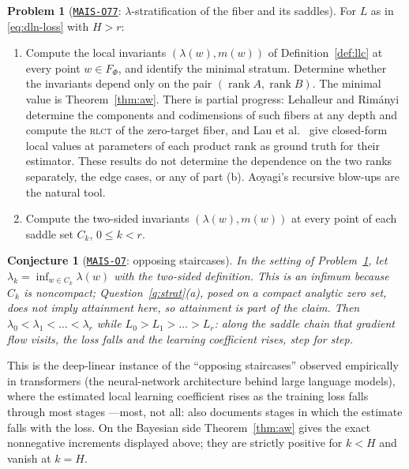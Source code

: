 \documentclass[11pt]{amsart}
\newcommand{\Oid}[1]{\href{https://github.com/lionellevine/MAIS/blob/main/open-problems/MAIS-O#1.md}{\texttt{MAIS-O#1}}}
\theoremstyle{plain}
\newtheorem{conjecture}[theorem]{Conjecture}
\theoremstyle{definition}
\newtheorem{problem}[theorem]{Problem}
\newcommand{\rank}{\operatorname{rank}}
\begin{document}
\begin{problem}[\Oid{77}: $\lambda$-stratification of the fiber and its saddles]\label{prob:fiber}
For $L$ as in \eqref{eq:dln-loss} with $H > r$:
\begin{enumerate}
\item[(a)] Compute the local invariants $(\lambda(w), m(w))$ of Definition~\ref{def:llc} at every point $w \in F_\Phi$, and identify the minimal stratum. Determine whether the invariants depend only on the pair $(\rank A, \rank B)$. The minimal value is Theorem~\ref{thm:aw}. There is partial progress: Lehalleur and Rim\'anyi \cite{lehalleurrimanyi2024} determine the components and codimensions of such fibers at any depth and compute the \textsc{rlct} of the zero-target fiber, and Lau et al.~\cite{lau2023} give closed-form local values at parameters of each product rank as ground truth for their estimator. These results do not determine the dependence on the two ranks separately, the edge cases, or any of part (b). Aoyagi's recursive blow-ups \cite{aoyagi2005,aoyagi2024} are the natural tool.
\item[(b)] Compute the two-sided invariants $(\lambda(w), m(w))$ at every point of each saddle set $C_k$, $0 \le k < r$.
\end{enumerate}
\end{problem}

\begin{conjecture}[\Oid{7}: opposing staircases]\label{conj:opposing}
In the setting of Problem~\ref{prob:fiber}, let $\lambda_k = \inf_{w \in C_k} \lambda(w)$ with the two-sided definition. This is an infimum because $C_k$ is noncompact; Question~\ref{q:strat}(a), posed on a compact analytic zero set, does not imply attainment here, so attainment is part of the claim. Then $\lambda_0 < \lambda_1 < \dots < \lambda_r$ while $L_0 > L_1 > \dots > L_r$: along the saddle chain that gradient flow visits, the loss falls and the learning coefficient rises, step for step.
\end{conjecture}

This is the deep-linear instance of the ``opposing staircases'' observed empirically in transformers (the neural-network architecture behind large language models), where the estimated local learning coefficient rises as the training loss falls through most stages \cite{hoogland2024, chen2023}---most, not all: \cite{hoogland2024} also documents stages in which the estimate falls with the loss. On the Bayesian side Theorem~\ref{thm:aw} gives the exact nonnegative increments displayed above; they are strictly positive for $k<H$ and vanish at $k=H$.
\end{document}

